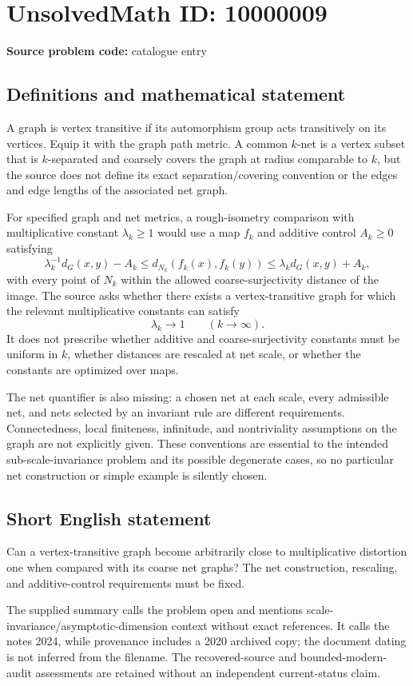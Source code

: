 \documentclass[11pt]{article}
\begin{document}
\section*{UnsolvedMath ID: 10000009}
\textbf{Source problem code:} catalogue entry
\subsection{Definitions and mathematical statement}
A graph is vertex transitive if its automorphism group acts transitively on its vertices. Equip it with the graph path metric. A common $k$-net is a vertex subset that is $k$-separated and coarsely covers the graph at radius comparable to $k$, but the source does not define its exact separation/covering convention or the edges and edge lengths of the associated net graph.

For specified graph and net metrics, a rough-isometry comparison with multiplicative constant $\lambda_k\ge1$ would use a map $f_k$ and additive control $A_k\ge0$ satisfying
\[
 \lambda_k^{-1}d_G(x,y)-A_k\le
 d_{N_k}(f_k(x),f_k(y))\le\lambda_k d_G(x,y)+A_k,
\]
with every point of $N_k$ within the allowed coarse-surjectivity distance of the image. The source asks whether there exists a vertex-transitive graph for which the relevant multiplicative constants can satisfy
\[
 \lambda_k\longrightarrow1\qquad(k\to\infty).
\]
It does not prescribe whether additive and coarse-surjectivity constants must be uniform in $k$, whether distances are rescaled at net scale, or whether the constants are optimized over maps.

The net quantifier is also missing: a chosen net at each scale, every admissible net, and nets selected by an invariant rule are different requirements. Connectedness, local finiteness, infinitude, and nontriviality assumptions on the graph are not explicitly given. These conventions are essential to the intended sub-scale-invariance problem and its possible degenerate cases, so no particular net construction or simple example is silently chosen.
\subsection{Short English statement}
Can a vertex-transitive graph become arbitrarily close to multiplicative distortion one when compared with its coarse net graphs? The net construction, rescaling, and additive-control requirements must be fixed.

The supplied summary calls the problem open and mentions scale-invariance/asymptotic-dimension context without exact references. It calls the notes 2024, while provenance includes a 2020 archived copy; the document dating is not inferred from the filename. The recovered-source and bounded-modern-audit assessments are retained without an independent current-status claim.
\end{document}
